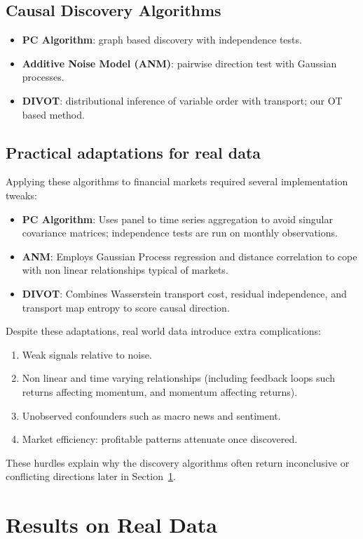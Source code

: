 \subsection{Causal Discovery Algorithms}
\begin{itemize}
    \item \textbf{PC Algorithm}: graph based discovery with independence tests.
    \item \textbf{Additive Noise Model (ANM)}: pairwise direction test with Gaussian processes.
    \item \textbf{DIVOT}: distributional inference of variable order with transport; our OT based method.
\end{itemize}

\subsection*{Practical adaptations for real data}
Applying these algorithms to financial markets required several implementation tweaks:
\begin{itemize}
    \item \textbf{PC Algorithm}: Uses panel to time series aggregation to avoid singular covariance matrices; independence tests are run on monthly observations.
    \item \textbf{ANM}: Employs Gaussian Process regression and distance correlation to cope with non linear relationships typical of markets.
    \item \textbf{DIVOT}: Combines Wasserstein transport cost, residual independence, and transport map entropy to score causal direction.
\end{itemize}
Despite these adaptations, real world data introduce extra complications:
\begin{enumerate}
    \item Weak signals relative to noise.
    \item Non linear and time varying relationships (including feedback loops such returns affecting momentum, and momentum affecting returns).
    \item Unobserved confounders such as macro news and sentiment.
    \item Market efficiency: profitable patterns attenuate once discovered.
\end{enumerate}
These hurdles explain why the discovery algorithms often return inconclusive or conflicting directions later in Section~\ref{sec:real_results}.

\section{Results on Real Data}
\label{sec:real_results}

